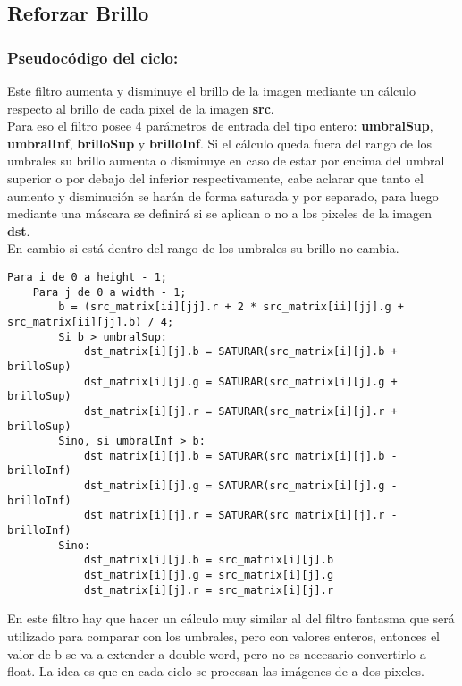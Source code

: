 \subsection{Reforzar Brillo}
\subsubsection{Pseudocódigo del ciclo:}
Este filtro aumenta y disminuye el brillo de la imagen mediante un cálculo respecto al brillo de cada pixel de la imagen \textbf{src}. \\
Para eso el filtro posee 4 parámetros de entrada del tipo entero: \textbf{umbralSup}, \textbf{umbralInf}, \textbf{brilloSup} y \textbf{brilloInf}. Si el cálculo queda fuera del rango de los umbrales su brillo aumenta o disminuye en caso de estar por encima del umbral superior o por debajo del inferior respectivamente, cabe aclarar que tanto el aumento y disminución se harán de forma saturada y por separado, para luego mediante una máscara se definirá si se aplican o no a los pixeles de la imagen \textbf{dst}. \\
En cambio si está dentro del rango de los umbrales su brillo no cambia.
\begin{codesnippet}
\begin{verbatim}
Para i de 0 a height - 1;
    Para j de 0 a width - 1; 
        b = (src_matrix[ii][jj].r + 2 * src_matrix[ii][jj].g + src_matrix[ii][jj].b) / 4;
        Si b > umbralSup:
            dst_matrix[i][j].b = SATURAR(src_matrix[i][j].b + brilloSup)
            dst_matrix[i][j].g = SATURAR(src_matrix[i][j].g + brilloSup)
            dst_matrix[i][j].r = SATURAR(src_matrix[i][j].r + brilloSup)
        Sino, si umbralInf > b:
            dst_matrix[i][j].b = SATURAR(src_matrix[i][j].b - brilloInf)
            dst_matrix[i][j].g = SATURAR(src_matrix[i][j].g - brilloInf)
            dst_matrix[i][j].r = SATURAR(src_matrix[i][j].r - brilloInf)
        Sino:
            dst_matrix[i][j].b = src_matrix[i][j].b
            dst_matrix[i][j].g = src_matrix[i][j].g
            dst_matrix[i][j].r = src_matrix[i][j].r
\end{verbatim}
\end{codesnippet}
En este filtro hay que hacer un cálculo muy similar al del filtro fantasma que será utilizado para comparar con los umbrales, pero con valores enteros, entonces el valor de b se va a extender a double word, pero no es necesario convertirlo a float.
La idea es que en cada ciclo se procesan las imágenes de a dos pixeles. \\

